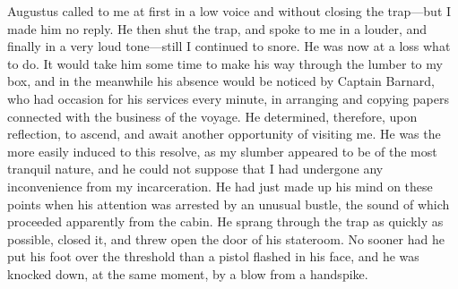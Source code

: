 Augustus called to me at first in a low voice and without closing the
trap---but I made him no reply. He then shut the trap, and spoke to me in a
louder, and finally in a very loud tone---still I continued to snore. He was now
at a loss what to do. It would take him some time to make his way through the
lumber to my box, and in the meanwhile his absence would be noticed by Captain
Barnard, who had occasion for his services every minute, in arranging and
copying papers connected with the business of the voyage. He determined,
therefore, upon reflection, to ascend, and await another opportunity of visiting
me. He was the more easily induced to this resolve, as my slumber appeared to be
of the most tranquil nature, and he could not suppose that I had undergone any
inconvenience from my incarceration. He had just made up his mind on these
points when his attention was arrested by an unusual bustle, the sound of which
proceeded apparently from the cabin. He sprang through the trap as quickly as
possible, closed it, and threw open the door of his stateroom. No sooner had he
put his foot over the threshold than a pistol flashed in his face, and he was
knocked down, at the same moment, by a blow from a handspike. 

